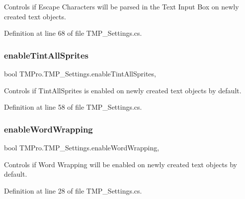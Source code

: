 Controls if Escape Characters will be parsed in the Text Input Box on newly created text objects. 



Definition at line 68 of file T\+M\+P\+\_\+\+Settings.\+cs.

\mbox{\label{class_t_m_pro_1_1_t_m_p___settings_acd54e15f66bbef3e4ac4d4d600a47c81}} 
\subsubsection{\texorpdfstring{enableTintAllSprites}{enableTintAllSprites}}
{\footnotesize\ttfamily bool T\+M\+Pro.\+T\+M\+P\+\_\+\+Settings.\+enable\+Tint\+All\+Sprites\hspace{0.3cm}{\ttfamily [static]}, {\ttfamily [get]}}



Controls if Tint\+All\+Sprites is enabled on newly created text objects by default. 



Definition at line 58 of file T\+M\+P\+\_\+\+Settings.\+cs.

\mbox{\label{class_t_m_pro_1_1_t_m_p___settings_afb5da705dc363bb384328fdc893c04ba}} 
\subsubsection{\texorpdfstring{enableWordWrapping}{enableWordWrapping}}
{\footnotesize\ttfamily bool T\+M\+Pro.\+T\+M\+P\+\_\+\+Settings.\+enable\+Word\+Wrapping\hspace{0.3cm}{\ttfamily [static]}, {\ttfamily [get]}}



Controls if Word Wrapping will be enabled on newly created text objects by default. 



Definition at line 28 of file T\+M\+P\+\_\+\+Settings.\+cs.

\mbox{\label{class_t_m_pro_1_1_t_m_p___settings_a2239a7f8504614b295bcee82ccffeaa5}} 
